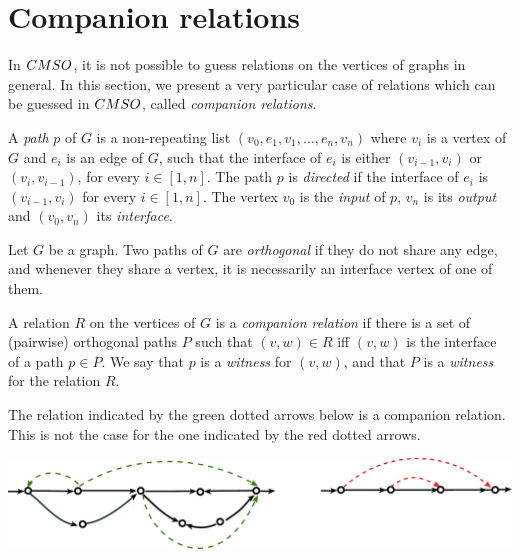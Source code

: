 \section{Companion relations}\label{sec:comp-rel}

In $\CMSO$, it is not possible to guess relations on the vertices of graphs in general. In this section, we present a very particular case of relations which can be guessed in $\CMSO$,  called \emph{companion relations}.

    \begin{definition}[Paths]
   A \emph{path} $p$ of $G$ is a non-repeating list $(v_0,e_1,v_1,\dots,e_n,v_n)$ where $v_i$ is a vertex of $G$ and $e_i$ is an edge of $G$, such that the interface of $e_i$ is either $(v_{i-1}, v_{i})$ or $(v_{i},v_{i-1})$, for every $i\in[1,n]$. The path $p$ is \emph{directed} if the interface of $e_i$ is  $(v_{i-1}, v_{i})$ for every $i\in[1,n]$. The vertex $v_0$ is the \emph{input} of $p$, $v_n$  is its \emph{output} and $(v_0,v_n)$ its \emph{interface}. 
   \end{definition} 


\begin{definition} Let $G$ be a graph. 
Two paths  of $G$ are \emph{orthogonal} if they do not share any edge, and whenever they share a vertex, it is necessarily an interface vertex of one of them. %

A relation $R$ on the vertices of $G$ is a \emph{companion relation} if there is a set of (pairwise) orthogonal paths $P$ such that $(v,w)\in R$ iff $(v,w)$ is the interface of a path $p\in P$. We say that $p$ is a \emph{witness} for $(v,w)$, and that $P$ is a \emph{witness} for the relation $R$.
\end{definition}

\begin{example} \label{ex:guared-set-of-paths}
The relation indicated by the green dotted arrows below is a companion relation. This is not the case for the one indicated by the red dotted arrows.
\begin{center}
\includegraphics[scale=.4]{Pictures/guarded-set-of-paths}
\end{center}
 \end{example}

